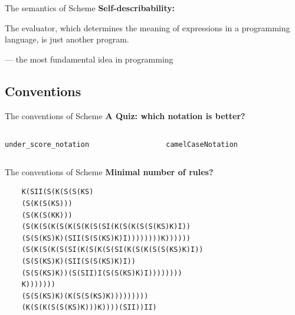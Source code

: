 \documentclass{beamer}
\begin{document}

\begin{frame}{The semantics of Scheme}
  \textbf{Self-describability:}
  \pause
  \begin{displayquote}
    The evaluator, which determines the meaning of expressions
    in a programming language, is just another program.
  \end{displayquote}
  --- the most fundamental idea in programming
\end{frame}

\subsection{Conventions}

\begin{frame}{The conventions of Scheme}
  \textbf{A Quiz: which notation is better?}
  \vspace{15mm}
  \begin{columns}[T]
    \begin{column}{.48\textwidth}
      \texttt{under\_score\_notation}
    \end{column}
    \hfill
    \begin{column}{.48\textwidth}
      \texttt{camelCaseNotation}
    \end{column}
  \end{columns}
  \pause
\end{frame}

\begin{frame}[fragile]{The conventions of Scheme}
  \textbf{Minimal number of rules?}
  \begin{Verbatim}
    K(SII(S(K(S(S(KS)
    (S(K(S(KS)))
    (S(K(S(KK)))
    (S(K(S(K(S(K(S(K(S(SI(K(S(K(S(S(KS)K)I))
    (S(S(KS)K)(SII(S(S(KS)K)I))))))))K))))))
    (S(K(S(K(S(SI(K(S(K(S(SI(K(S(K(S(S(KS)K)I))
    (S(S(KS)K)(SII(S(S(KS)K)I))
    (S(S(KS)K))(S(SII)I(S(S(KS)K)I))))))))
    K)))))))
    (S(S(KS)K)(K(S(S(KS)K)))))))))
    (K(S(K(S(S(KS)K)))K))))(SII))II)
  \end{Verbatim}
\end{frame}
\end{document}
